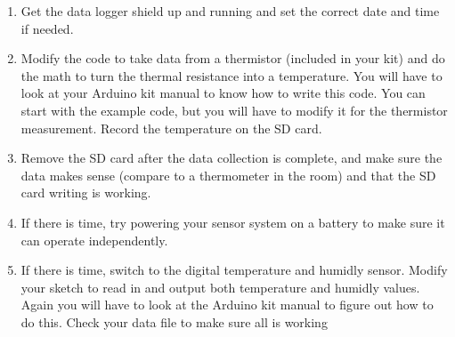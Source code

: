 	\begin{enumerate}
		\item Get the data logger shield up and running and set the correct date and time if needed.
		
		\item Modify the code to take data from a thermistor (included in your kit) and do the math to turn the thermal resistance into a temperature. You will have to look at your Arduino kit manual to know how to write this code. You can start with the example code, but you will have to modify it for the thermistor measurement. Record the temperature on the SD card.
		
		\item Remove the SD card after the data collection is complete, and make sure the data makes sense (compare to a thermometer in the room) and that the SD card writing is working.
		
		\item If there is time, try powering your sensor system on a battery to make sure it can operate independently.
		
		\item If there is time, switch to the digital temperature and humidly sensor. Modify your sketch to read in and output both temperature and humidly values. Again you will have to look at the Arduino kit manual to figure out how to do this. Check your data file to make sure all is working
	\end{enumerate}


